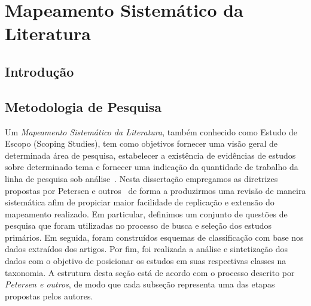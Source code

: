 
\chapter{Mapeamento Sistemático da Literatura}
\label{ch:mapeamento-sistematico}

\section{Introdução}
\label{sec:map-intro}

\section{Metodologia de Pesquisa}
\label{sec:map-metodologia}

Um \textit{Mapeamento Sistemático da Literatura}, também conhecido como Estudo
de Escopo (Scoping Studies), tem como objetivos fornecer uma visão geral de
determinada área de pesquisa, estabelecer a existência de evidências de estudos
sobre determinado tema e fornecer uma indicação da quantidade de trabalho da
linha de pesquisa sob
análise~\cite{keele2007guidelines,wohlin2012experimentation}.  Nesta dissertação
empregamos as diretrizes propostas por Petersen e outros~\cite{Petersen2008} de
forma a produzirmos uma revisão de maneira sistemática afim de propiciar maior
facilidade de replicação e extensão do mapeamento realizado. Em particular,
definimos um conjunto de questões de pesquisa que foram utilizadas no processo
de busca e seleção dos estudos primários. Em seguida, foram construídos esquemas
de classificação com base nos dados extraídos  dos artigos. Por fim, foi
realizada a análise e sintetização dos dados com o objetivo de posicionar os
estudos em suas respectivas classes na taxonomia. A estrutura desta seção está
de acordo com o processo descrito por \textit{Petersen e outros}, de modo que
cada subseção representa uma das etapas propostas pelos autores.

